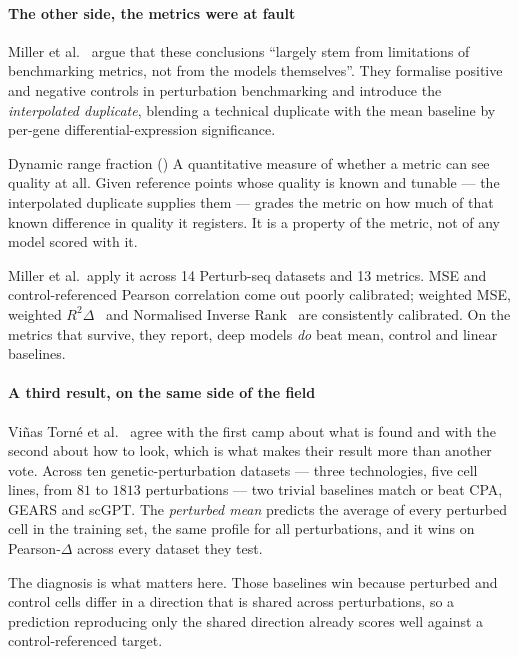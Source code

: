 \paragraph{The other side, the metrics were at fault} Miller et
al.~\cite{miller} argue that these conclusions ``largely stem from limitations of
benchmarking metrics, not from the models themselves''. They formalise positive
and negative controls in perturbation benchmarking and introduce the
\emph{interpolated duplicate}, blending a technical duplicate with the mean
baseline by per-gene differential-expression
significance.

\begin{defn}{Dynamic range fraction (\DRF)}
A quantitative measure of whether a metric can see quality at all. Given
reference points whose quality is known and tunable --- the interpolated
duplicate supplies them --- \DRF{} grades the metric on how much of that known
difference in quality it registers. It is a property of the metric, not of any
model scored with it.
\end{defn}

Miller et al.\ apply it across 14 Perturb-seq datasets and 13 metrics. MSE and
control-referenced Pearson correlation come out poorly calibrated; weighted MSE,
weighted $R^2\Delta$~\cite{mejia} and Normalised Inverse
Rank~\cite{perturbench} are consistently calibrated. On the metrics that survive,
they report, deep models \emph{do} beat mean, control and linear baselines.

\paragraph{A third result, on the same side of the field}
Vi\~nas Torn\'e et al.~\cite{systema} agree with the first camp about what is
found and with the second about how to look, which is what makes their result
more than another vote. Across ten genetic-perturbation datasets --- three
technologies, five cell lines, from $81$ to $\num{1813}$ perturbations --- two
trivial baselines match or beat CPA, GEARS and scGPT. The \emph{perturbed mean}
predicts the average of every perturbed cell in the training set, the same
profile for all perturbations, and it wins on Pearson-$\Delta$ across every
dataset they test.

The diagnosis is what matters here. Those baselines win because perturbed and
control cells differ in a direction that is shared across perturbations, so a
prediction reproducing only the shared direction already scores well against a
control-referenced target.

